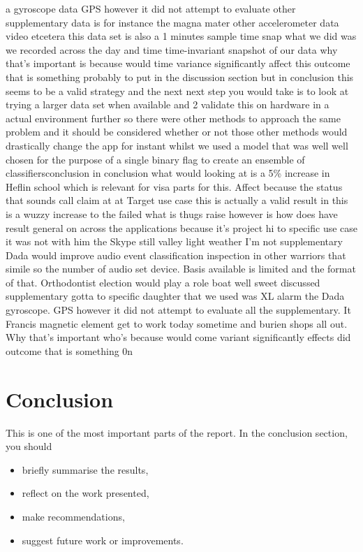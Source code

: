 \documentclass{UoNMCHA}
\numberwithin{equation}{section}
\begin{document}
a gyroscope data GPS however it did not attempt to evaluate other supplementary data is for instance the magna mater other accelerometer data video etcetera this data set is also a 1 minutes sample time snap what we did was we recorded across the day and time time-invariant snapshot of our data why that's important is because would time variance significantly affect this outcome that is something probably to put in the discussion section but in conclusion this seems to be a valid strategy and the next next step you would take is to look at trying a larger data set when available and 2 validate this on hardware in a actual environment further so there were other methods to approach the same problem and it should be considered whether or not those other methods would drastically change the app for instant whilst we used a model that was well well chosen for the purpose of a single binary flag to create an ensemble of classifiersconclusion in conclusion what would looking at is a 5\% increase in Heflin school which is relevant for visa parts for this. Affect because the status that sounds call claim at at Target use case this is actually a valid result in this is a wuzzy increase to the failed what is thugs raise however is how does have result general on across the applications because it's project hi to specific use case it was not with him the Skype still valley light weather I'm not supplementary Dada would improve audio event classification inspection in other warriors that simile so the number of audio set device. Basis available is limited and the format of that. Orthodontist election would play a role boat well sweet discussed supplementary gotta to specific daughter that we used was XL alarm the Dada gyroscope. GPS however it did not attempt to evaluate all the supplementary. It Francis magnetic element get to work today sometime and burien shops all out. Why that's important who's because would come variant significantly effects did outcome that is something 0n


\section{Conclusion}\label{sec:Conclusion}
This is one of the most important parts of the report. In the conclusion section, you  should 
\begin{itemize}
\item briefly summarise the results,
\item reflect on the work presented, 
\item make recommendations,
\item suggest future work or improvements.
\end{itemize}
\end{document}
